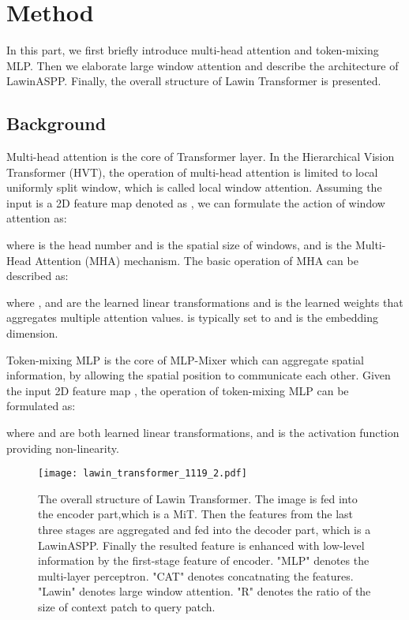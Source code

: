 \documentclass[10pt,twocolumn,letterpaper]{article}
\begin{document}
\section{Method}
In this part, we first briefly introduce multi-head attention and token-mixing MLP. Then we elaborate large window attention and describe the architecture of LawinASPP. Finally, the overall structure of Lawin Transformer is presented.




\subsection{Background}
\label{sec:3.1}
Multi-head attention is the core of Transformer layer. In the Hierarchical Vision Transformer (HVT), the operation of multi-head attention is limited to local uniformly split window, which is called local window attention. Assuming the input is a 2D feature map denoted as , we can formulate the action of window attention as:  


where  is the head number and  is the spatial size of windows, and  is the Multi-Head Attention (MHA) mechanism. The basic operation of MHA can be described as:

where ,  and  are the learned linear transformations and  is the learned weights that aggregates multiple attention values.  is typically set to  and  is the embedding dimension.

Token-mixing MLP is the core of MLP-Mixer which can aggregate spatial information, by allowing the spatial position to communicate each other. Given the input 2D feature map , the operation of token-mixing MLP can be formulated as:

where  and  are both learned linear transformations, and  is the activation function providing non-linearity.

\begin{figure*}[t]
\begin{center}
\texttt{[image: lawin\_transformer\_1119\_2.pdf]} \vspace{-0.8cm}
\end{center}
   \caption{The overall structure of Lawin Transformer. The image is fed into the encoder part,which is a MiT. Then the features from the last three stages are aggregated and fed into the decoder part, which is a LawinASPP. Finally the resulted feature is enhanced with low-level information by the first-stage feature of encoder. "MLP" denotes the multi-layer perceptron. "CAT" denotes concatnating the features. "Lawin" denotes large window attention. "R" denotes the ratio of the size of context patch to query patch.}
\label{fig:lawin transformer}
\end{figure*}
\end{document}
